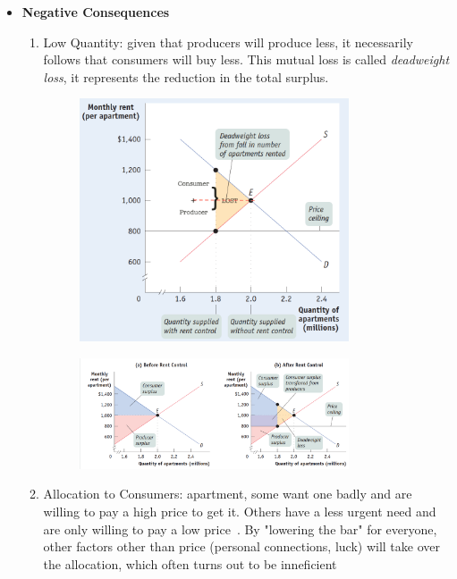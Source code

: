 \documentclass[english,course, draft]{Notes}
\newcommand{\ita}[1]{\textit{#1}}
\begin{document}
\begin{itemize}
	\item \textbf{Negative Consequences}
	\begin{enumerate}
		\item Low Quantity: given that producers will produce less, it necessarily follows that consumers will buy less. This mutual loss is called \ita{deadweight loss}, it represents the reduction in the total surplus.
		
		
		\begin{figure}[h]
\centering
\includegraphics[height=0.4\textwidth,width=0.8\textwidth]{deadweight}
\end{figure}
\begin{figure}[h]
\centering
\includegraphics[height=0.4\textwidth,width=0.8\textwidth]{deadweight2}
\end{figure}
	
	\item Allocation to Consumers: apartment, some want one badly and are willing to pay a high price to get it. Others have a less urgent need and are only willing to pay a low price~. By "lowering the bar" for everyone, other factors other than price (personal connections, luck) will take over the allocation, which often turns out to be inneficient
		

\end{enumerate}
\end{itemize}
\end{document}
